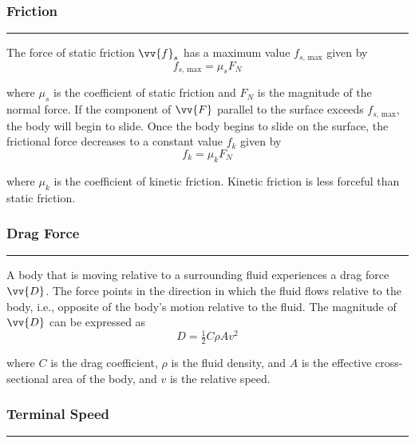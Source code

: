 \documentclass{article}
\begin{document}
    \smallskip
    \subsubsection*{Friction}
    \vspace{-1em}
    \rule{\linewidth}{.1mm}

    \smallskip\noindent
    The force of static friction $\vv{f}_s$ has a maximum value $f_{s\text{, max}}$ given by
    \[
        f_{s\text{, max}} = \mu_s F_N
    \]

    \smallskip\noindent
    where $\mu_s$ is the coefficient of static friction and $F_N$ is the magnitude of the normal force.
    If the component of $\vv{F}$ parallel to the surface exceeds $f_{s\text{, max}}$, the body will begin to slide.
    Once the body begins to slide on the surface, the frictional force decreases to a constant value $f_k$ given by
    \[
        f_k=\mu_k F_N
    \]

    \smallskip\noindent
    where $\mu_k$ is the coefficient of kinetic friction.
    Kinetic friction is less forceful than static friction.

    \smallskip
    \subsubsection*{Drag Force}
    \vspace{-1em}
    \rule{\linewidth}{.1mm}

    \smallskip\noindent
    A body that is moving relative to a surrounding fluid experiences a drag force $\vv{D}$.
    The force points in the direction in which the fluid flows relative to the body, i.e., opposite of the body's motion relative to the fluid.
    The magnitude of $\vv{D}$ can be expressed as
    \[
        D=\tfrac{1}{2}C\rho Av^2
    \]

    \vspace{.2em}
    \smallskip\noindent
    where $C$ is the drag coefficient, $\rho$ is the fluid density, and $A$ is the effective cross-sectional area of the body, and $v$ is the relative speed.

    \smallskip
    \subsubsection*{Terminal Speed}
    \vspace{-1em}
    \rule{\linewidth}{.1mm}
\end{document}
